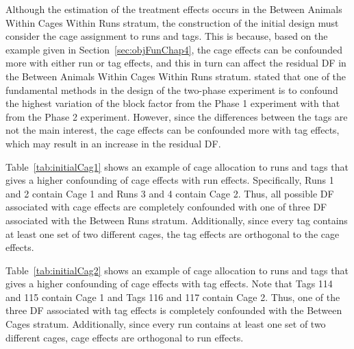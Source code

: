 Although the estimation of the treatment effects occurs in the Between Animals Within Cages Within Runs stratum, the construction of the initial design must consider the cage assignment to runs and tags. This is because, based on the example given in Section~\ref{sec:objFunChap4}, the cage effects can be confounded more with either run or tag effects, and this in turn can affect the residual DF in the Between Animals Within Cages Within Runs stratum. \cite{Brien2011} stated that one of the fundamental methods in the design of the two-phase experiment is to confound the highest variation of the block factor from the Phase 1 experiment with that from the Phase 2 experiment. However, since the differences between the tags are not the main interest, the cage effects can be confounded more with tag effects, which may result in an increase in the residual DF.  

Table~\ref{tab:initialCag1} shows an example of cage allocation to runs and tags that gives a higher confounding of cage effects with run effects. Specifically, Runs 1 and 2 contain Cage 1 and Runs 3 and 4 contain Cage 2. Thus, all possible DF associated with cage effects are completely confounded with one of three DF associated with the Between Runs stratum. Additionally, since every tag contains at least one set of two different cages, the tag effects are orthogonal to the cage effects.

Table~\ref{tab:initialCag2} shows an example of cage allocation to runs and tags that gives a higher confounding of cage effects with tag effects. Note that Tags 114 and 115 contain Cage 1 and Tags 116 and 117 contain Cage 2. Thus, one of the three DF associated with tag effects is completely confounded with the Between Cages stratum. Additionally, since every run contains at least one set of two different cages, cage effects are orthogonal to run effects. 

